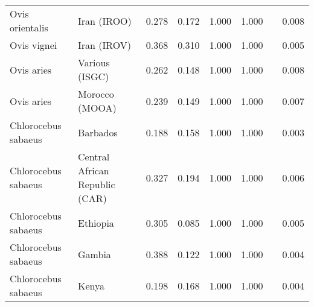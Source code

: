 \begin{center}
\begin{adjustbox}{width = 1\textwidth}
\begin{tabular}{|l|l|r|r|r|r|r|}
     Ovis orientalis &                     Iran (IROO) &                                              0.278 &                                              0.172 &                1.000 &                                  1.000~~ &              0.008 \\
         Ovis vignei &                     Iran (IROV) &                                              0.368 &                                              0.310 &                1.000 &                                  1.000~~ &              0.005 \\
          Ovis aries &                  Various (ISGC) &                                              0.262 &                                              0.148 &                1.000 &                                  1.000~~ &              0.008 \\
          Ovis aries &                  Morocco (MOOA) &                                              0.239 &                                              0.149 &                1.000 &                                  1.000~~ &              0.007 \\
 Chlorocebus sabaeus &                        Barbados &                                              0.188 &                                              0.158 &                1.000 &                                  1.000~~ &              0.003 \\
 Chlorocebus sabaeus &  Central African Republic (CAR) &                                              0.327 &                                              0.194 &                1.000 &                                  1.000~~ &              0.006 \\
 Chlorocebus sabaeus &                        Ethiopia &                                              0.305 &                                              0.085 &                1.000 &                                  1.000~~ &              0.005 \\
 Chlorocebus sabaeus &                          Gambia &                                              0.388 &                                              0.122 &                1.000 &                                  1.000~~ &              0.004 \\
 Chlorocebus sabaeus &                           Kenya &                                              0.198 &                                              0.168 &                1.000 &                                  1.000~~ &              0.004 \\

\end{tabular}
\end{adjustbox}
\end{center}
